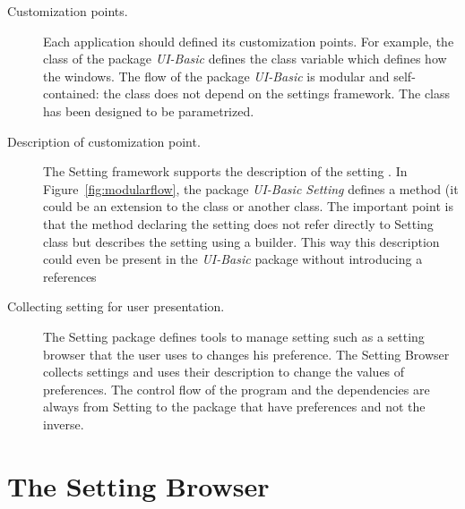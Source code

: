 \documentclass[a4paper,10pt,twoside]{book}
\begin{document}
\begin{description}
\item[Customization points.] Each application should defined its customization points. For example, the class  of the package \emph{UI-Basic} defines the class variable  which defines how the windows. The flow of the package \emph{UI-Basic} is modular and self-contained: the class  does not depend on the settings framework.  The class   has been designed to be parametrized.

\item[Description of customization point.] The Setting framework supports the description of the setting . In Figure~\ref{fig:modularflow}, the package \emph{UI-Basic Setting} defines a method (it could be an extension to the class  or another class. The important point is that the method declaring the setting does not refer directly to Setting class but describes the setting using a builder. This way this description could even be present in the \emph{UI-Basic} package without introducing a references

\item[Collecting setting for user presentation.] The Setting package defines tools to manage setting such as a setting browser that the user uses to changes his preference. The Setting Browser collects settings and uses their description to change the values of preferences.
The control flow of the program and the dependencies are always from Setting to the package that have preferences and not the inverse. 
\end{description}

\section{The Setting Browser}
\label{sec:TheSettingsBrowser}
\end{document}
